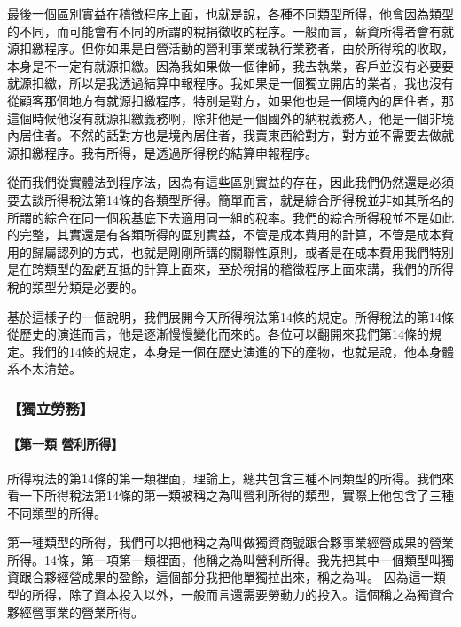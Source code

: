 \documentclass[oneside,sub3section]{ctexbook}
\let\oldparagraph\paragraph
\renewcommand{\paragraph}[1]{\oldparagraph{#1}\mbox{}}
\begin{document}
最後一個區別實益在稽徵程序上面，也就是說，各種不同類型所得，他會因為類型的不同，而可能會有不同的所謂的稅捐徵收的程序。一般而言，薪資所得者會有就源扣繳程序。但你如果是自營活動的營利事業或執行業務者，由於所得稅的收取，本身是不一定有就源扣繳。因為我如果做一個律師，我去執業，客戶並沒有必要要就源扣繳，所以是我透過結算申報程序。我如果是一個獨立開店的業者，我也沒有從顧客那個地方有就源扣繳程序，特別是對方，如果他也是一個境內的居住者，那這個時候他沒有就源扣繳義務啊，除非他是一個國外的納稅義務人，他是一個非境內居住者。不然的話對方也是境內居住者，我賣東西給對方，對方並不需要去做就源扣繳程序。我有所得，是透過所得稅的結算申報程序。

從而我們從實體法到程序法，因為有這些區別實益的存在，因此我們仍然還是必須要去談所得稅法第14條的各類型所得。簡單而言，就是綜合所得稅並非如其所名的所謂的綜合在同一個稅基底下去適用同一組的稅率。我們的綜合所得稅並不是如此的完整，其實還是有各類所得的區別實益，不管是成本費用的計算，不管是成本費用的歸屬認列的方式，也就是剛剛所講的關聯性原則，或者是在成本費用我們特別是在跨類型的盈虧互抵的計算上面來，至於稅捐的稽徵程序上面來講，我們的所得稅的類型分類是必要的。

基於這樣子的一個說明，我們展開今天所得稅法第14條的規定。所得稅法的第14條從歷史的演進而言，他是逐漸慢慢變化而來的。各位可以翻開來我們第14條的規定。我們的14條的規定，本身是一個在歷史演進的下的產物，也就是說，他本身體系不太清楚。

\hypertarget{ux7368ux7acbux52deux52d9}{%
\subsubsection{【獨立勞務】}\label{ux7368ux7acbux52deux52d9}}

\hypertarget{ux7b2cux4e00ux985e-ux71dfux5229ux6240ux5f97}{%
\paragraph{【第一類 營利所得】}\label{ux7b2cux4e00ux985e-ux71dfux5229ux6240ux5f97}}

所得稅法的第14條的第一類裡面，理論上，總共包含三種不同類型的所得。我們來看一下所得稅法第14條的第一類被稱之為叫營利所得的類型，實際上他包含了三種不同類型的所得。

第一種類型的所得，我們可以把他稱之為叫做獨資商號跟合夥事業經營成果的營業所得。14條，第一項第一類裡面，他稱之為叫營利所得。我先把其中一個類型叫獨資跟合夥經營成果的盈餘，這個部分我把他單獨拉出來，稱之為叫。
因為這一類型的所得，除了資本投入以外，一般而言還需要勞動力的投入。這個稱之為獨資合夥經營事業的營業所得。
\end{document}
